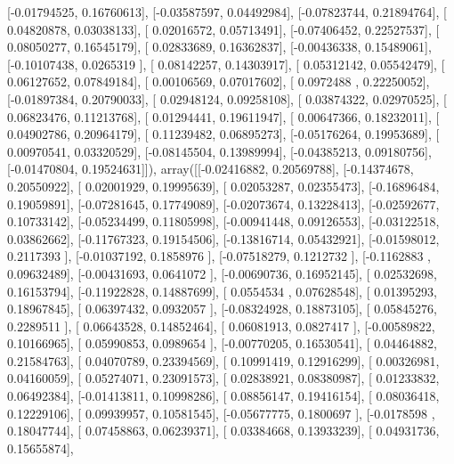 \documentclass{article}
\begin{document}
       [-0.01794525,  0.16760613],
       [-0.03587597,  0.04492984],
       [-0.07823744,  0.21894764],
       [ 0.04820878,  0.03038133],
       [ 0.02016572,  0.05713491],
       [-0.07406452,  0.22527537],
       [ 0.08050277,  0.16545179],
       [ 0.02833689,  0.16362837],
       [-0.00436338,  0.15489061],
       [-0.10107438,  0.0265319 ],
       [ 0.08142257,  0.14303917],
       [ 0.05312142,  0.05542479],
       [ 0.06127652,  0.07849184],
       [ 0.00106569,  0.07017602],
       [ 0.0972488 ,  0.22250052],
       [-0.01897384,  0.20790033],
       [ 0.02948124,  0.09258108],
       [ 0.03874322,  0.02970525],
       [ 0.06823476,  0.11213768],
       [ 0.01294441,  0.19611947],
       [ 0.00647366,  0.18232011],
       [ 0.04902786,  0.20964179],
       [ 0.11239482,  0.06895273],
       [-0.05176264,  0.19953689],
       [ 0.00970541,  0.03320529],
       [-0.08145504,  0.13989994],
       [-0.04385213,  0.09180756],
       [-0.01470804,  0.19524631]]), array([[-0.02416882,  0.20569788],
       [-0.14374678,  0.20550922],
       [ 0.02001929,  0.19995639],
       [ 0.02053287,  0.02355473],
       [-0.16896484,  0.19059891],
       [-0.07281645,  0.17749089],
       [-0.02073674,  0.13228413],
       [-0.02592677,  0.10733142],
       [-0.05234499,  0.11805998],
       [-0.00941448,  0.09126553],
       [-0.03122518,  0.03862662],
       [-0.11767323,  0.19154506],
       [-0.13816714,  0.05432921],
       [-0.01598012,  0.2117393 ],
       [-0.01037192,  0.1858976 ],
       [-0.07518279,  0.1212732 ],
       [-0.1162883 ,  0.09632489],
       [-0.00431693,  0.0641072 ],
       [-0.00690736,  0.16952145],
       [ 0.02532698,  0.16153794],
       [-0.11922828,  0.14887699],
       [ 0.0554534 ,  0.07628548],
       [ 0.01395293,  0.18967845],
       [ 0.06397432,  0.0932057 ],
       [-0.08324928,  0.18873105],
       [ 0.05845276,  0.2289511 ],
       [ 0.06643528,  0.14852464],
       [ 0.06081913,  0.0827417 ],
       [-0.00589822,  0.10166965],
       [ 0.05990853,  0.0989654 ],
       [-0.00770205,  0.16530541],
       [ 0.04464882,  0.21584763],
       [ 0.04070789,  0.23394569],
       [ 0.10991419,  0.12916299],
       [ 0.00326981,  0.04160059],
       [ 0.05274071,  0.23091573],
       [ 0.02838921,  0.08380987],
       [ 0.01233832,  0.06492384],
       [-0.01413811,  0.10998286],
       [ 0.08856147,  0.19416154],
       [ 0.08036418,  0.12229106],
       [ 0.09939957,  0.10581545],
       [-0.05677775,  0.1800697 ],
       [-0.0178598 ,  0.18047744],
       [ 0.07458863,  0.06239371],
       [ 0.03384668,  0.13933239],
       [ 0.04931736,  0.15655874],
\end{document}
